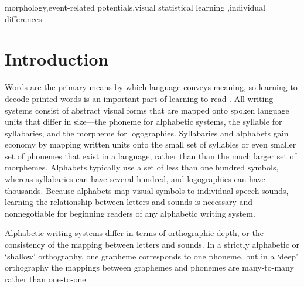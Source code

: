 \documentclass[review]{elsarticle}
\begin{document}
\begin{frontmatter}

\begin{keyword}
 morphology\sep event-related potentials\sep visual statistical learning \sep individual differences
\end{keyword}

\end{frontmatter}

\linenumbers

\section{Introduction}

Words are the primary means by which language conveys meaning, so learning to decode printed words is an important part of learning to read \citep[e.g.,][]{castles_ending_2018} .  All writing systems consist of abstract visual forms that are mapped onto spoken language units that differ in size—the phoneme for alphabetic systems, the syllable for syllabaries, and the morpheme for logographies. Syllabaries and alphabets gain economy by mapping written units onto the small set of syllables or even smaller set of phonemes  that exist in a language, rather than than the much larger set of morphemes. Alphabets typically use a set of less than one hundred symbols, whereas syllabaries can have several hundred, and logographies can have thousands. Because alphabets map visual symbols to individual speech sounds,  learning the relationship between letters and sounds is necessary and nonnegotiable for beginning readers of any alphabetic writing system.

Alphabetic writing systems differ in terms of orthographic depth, or the consistency of the mapping between letters and sounds. In a strictly alphabetic or ‘shallow’ orthography, one grapheme corresponds to one phoneme, but in a ‘deep’ orthography the mappings between graphemes and phonemes  are many-to-many rather than one-to-one. 
\end{document}
